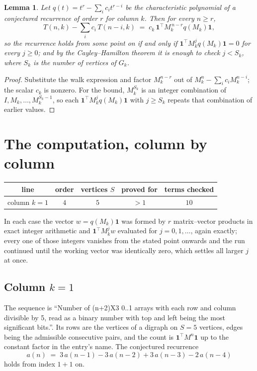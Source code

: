 \documentclass[11pt,a4paper]{article}
\theoremstyle{plain}
\newtheorem{lemma}[theorem]{Lemma}
\theoremstyle{definition}
\begin{document}
\begin{lemma}\label{lem:crit}
Let $q(t)=t^{r}-\sum_i c_it^{r-i}$ be the characteristic polynomial of a conjectured
recurrence of order $r$ for column $k$. Then for every $n\ge r$,
\[
T(n,k)-\sum_i c_i\,T(n-i,k)\;=\;c_k\,\mathbf{1}^{\!\top}M_k^{\,n-r}q(M_k)\mathbf{1},
\]
so the recurrence holds from some point on if and only if
$\mathbf{1}^{\!\top}M_k^{j}q(M_k)\mathbf{1}=0$ for every $j\ge0$; and by the
Cayley--Hamilton theorem it is enough to check $j<S_k$, where $S_k$ is the number of vertices
of $G_k$.
\end{lemma}

\begin{proof}
Substitute the walk expression and factor $M_k^{n-r}$ out of $M_k^{n}-\sum_ic_iM_k^{n-i}$;
the scalar $c_k$ is nonzero. For the bound, $M_k^{S_k}$ is an integer combination of
$I,M_k,\dots,M_k^{S_k-1}$, so each $\mathbf{1}^{\!\top}M_k^{j}q(M_k)\mathbf{1}$ with
$j\ge S_k$ repeats that combination of earlier values.
\end{proof}

\section{The computation, column by column}

\begin{center}
\begin{tabular}{ccccc}
line & order & vertices $S$ & proved for & terms checked \\ \hline
column $k$$=1$ & $4$ & $5$ & $>1$ & $10$ \\
\end{tabular}
\end{center}

In each case the vector $w=q(M_k)\mathbf{1}$ was formed by $r$ matrix--vector products in
exact integer arithmetic and $\mathbf{1}^{\!\top}M_k^{j}w$ evaluated for $j=0,1,\dots$,
again exactly; every one of those integers vanishes from the stated point onwards and the run
continued until the working vector was identically zero, which settles all larger $j$ at once.

\subsection*{Column $k$$=1$}
The sequence is ``Number of (n+2)X3 0..1 arrays with each row and column divisible by 5, read as a binary number with top and left being the most significant bits.''. Its rows are the vertices of a digraph on
$S=5$ vertices, edges being the admissible consecutive pairs, and the count is
$\mathbf{1}^{\!\top}M^{n}\mathbf{1}$ up to the constant factor in the entry's name.
The conjectured recurrence
\[
a(n)\;=\;3\,a(n-1) - 3\,a(n-2) + 3\,a(n-3) - 2\,a(n-4)
\]
holds from index $1+1$ on.
\end{document}

